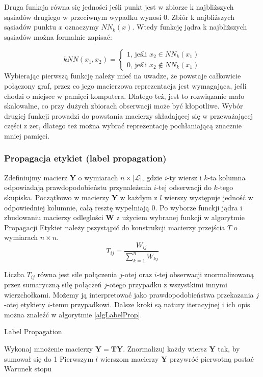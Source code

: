 \documentclass{article}
\begin{document}
Druga funkcja równa się jedności jeśli punkt jest w zbiorze k najbliższych sąsiadów drugiego w przeciwnym wypadku wynosi 0.
Zbiór k najbliższych sąsiadów punktu $x$ oznaczymy $NN_k(x)$.
Wtedy funkcję jądra k najbliższych sąsiadów można formalnie zapisać:

\[kNN(x_1, x_2) = \begin{cases}
	1\text{, jeśli } x_2 \in NN_k(x_1) \\
	0\text{, jeśli } x_2 \notin NN_k(x_1)
\end{cases} \] 
Wybierając pierwszą funkcję należy mieć na uwadze, że powstaje całkowicie połączony graf, przez co jego macierzowa reprezentacja jest wymagająca, jeśli chodzi o miejsce w pamięci komputera.
Dlatego też, jest to rozwiązanie mało skalowalne, co przy dużych zbiorach obserwacji może być kłopotliwe.
Wybór drugiej funkcji prowadzi do powstania macierzy składającej się w przeważającej części z zer, dlatego też można wybrać reprezentację pochłaniającą znacznie mniej pamięci.
\subsubsection{Propagacja etykiet (label propagation)}
\label{rozLabelPropagation}
Zdefiniujmy macierz \textbf{Y} o wymiarach $n \times |\mathcal{L}|$, gdzie $i$-ty wiersz i $k$-ta kolumna odpowiadają prawdopodobieństu przynależenia $i$-tej odserwacji do $k$-tego skupiska.
Początkowo w macierzy \textbf{Y} w każdym z $l$ wierszy występuje jedność w odpowiedniej kolumnie, całą resztę wypełniają 0.
Po wyborze funckji jądra i zbudowaniu macierzy odleglości \textbf{W} z użyciem wybranej funkcji w algorytmie Propagacji Etykiet należy pszystąpić do konstrukcji macierzy przejścia \(T\) o wymiarach $n \times n$.
\[T_{ij} = \frac{W_{ij}}{\sum^n_{k=1}W_{kj}}\]

Liczba $T_{ij}$ równa jest sile połączenia $j$-otej oraz $i$-tej obserwacji znormalizowaną przez sumaryczną siłę połączeń $j$-otego przypadku z wszystkimi innymi wierzchołkami.
Możemy ją interpretować jako prawdopodobieństwa przekazania $j$-otej etykiety $i$-temu przypadkowi.
Dalsze kroki są natury iteracyjnej i ich opis można znaleźć w algorytmie \ref{algLabelProp}.

\begin{algorithm}
\caption{Label Propagation}
\label{algLabelProp}
\begin{algorithmic}[1]
\REPEAT
\STATE Wykonaj mnożenie macierzy \(\mathbf{Y} = \mathbf{TY}\).
\STATE Znormalizuj każdy wiersz \textbf{Y} tak, by sumował się do 1
\STATE Pierwszym $l$ wierszom macierzy $\textbf{Y}$ przywróć pierwotną postać
\UNTIL Warunek stopu
\end{algorithmic}
\end{algorithm}
\end{document}
